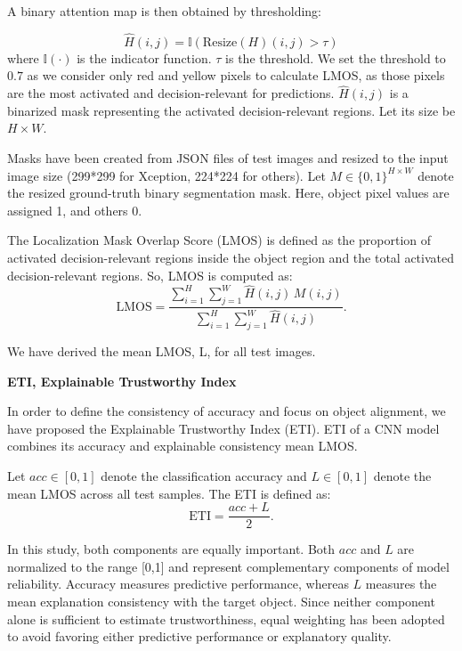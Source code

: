 \documentclass[a4paper,fleqn]{cas-dc}
\begin{document}
A binary attention map is then obtained by thresholding:

\begin{equation}
\hat{H}(i,j) = \mathbb{I}\left( \mathrm{Resize}(H)(i,j) > \tau \right)
\end{equation}
where $\mathbb{I}(\cdot)$ is the indicator function. $\tau$ is the threshold. We set the threshold to $0.7$ as we consider only red and yellow pixels to calculate LMOS, as those pixels are the most activated and decision-relevant for predictions. $\hat{H}(i,j)$ is a binarized mask representing the activated decision-relevant regions. Let its size be ${H \times W}$. 

Masks have been created from JSON files of test images and resized to the input image size (299*299 for Xception, 224*224 for others). Let $M \in \{0,1\}^{H \times W}$ denote the resized ground-truth binary segmentation mask. Here, object pixel values are assigned 1, and others 0.

The Localization Mask Overlap Score (LMOS) is defined as the proportion of activated decision-relevant regions inside the object region and the total activated decision-relevant regions. So, LMOS is computed as:
\begin{equation}
\mathrm{LMOS} =
\frac{\sum_{i=1}^{H}\sum_{j=1}^{W} \hat{H}(i,j)\, M(i,j)}
{\sum_{i=1}^{H}\sum_{j=1}^{W} \hat{H}(i,j)}.
\end{equation}

We have derived the mean LMOS, L, for all test images.


\noindent\textbf{ETI, Explainable Trustworthy Index}

In order to define the consistency of accuracy and focus on object alignment, we have proposed the Explainable Trustworthy Index (ETI). ETI of a CNN model combines its accuracy and explainable consistency mean LMOS. 

Let $acc \in [0,1]$ denote the classification accuracy and $L \in [0,1]$ denote the mean LMOS across all test samples. The ETI is defined as:
\[
\mathrm{ETI} = \frac{acc + L}{2}.
\]



In this study, both components are equally important. Both ${acc}$ and ${L}$ are normalized to the range [0,1] and represent complementary components of model reliability. Accuracy measures predictive performance, whereas ${L}$ measures the mean explanation consistency with the target object. Since neither component alone is sufficient to estimate trustworthiness, equal weighting has been adopted to avoid favoring either predictive performance or explanatory quality.
\end{document}
